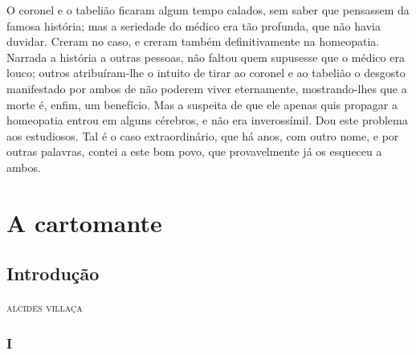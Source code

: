 O coronel e o tabelião ficaram algum tempo calados, sem saber que
pensassem da famosa história; mas a seriedade do médico era tão
profunda, que não havia duvidar. Creram no caso, e creram também
definitivamente na homeopatia. Narrada a história a outras pessoas, não
faltou quem supusesse que o médico era louco; outros atribuíram-lhe o
intuito de tirar ao coronel e ao tabelião o desgosto manifestado por
ambos de não poderem viver eternamente, mostrando-lhes que a morte é,
enfim, um benefício. Mas a suspeita de que ele apenas quis propagar a
homeopatia entrou em alguns cérebros, e não era inverossímil. Dou este
problema aos estudiosos. Tal é o caso extraordinário, que há anos, com
outro nome, e por outras palavras, contei a este bom povo, que
provavelmente já os esqueceu a ambos. 

\part{A cartomante}

\chapter[Introdução, \emph{por Alcides Villaça}]{Introdução}

\begin{flushright}
\textsc{alcides villaça}
\end{flushright}

\section*{I}

